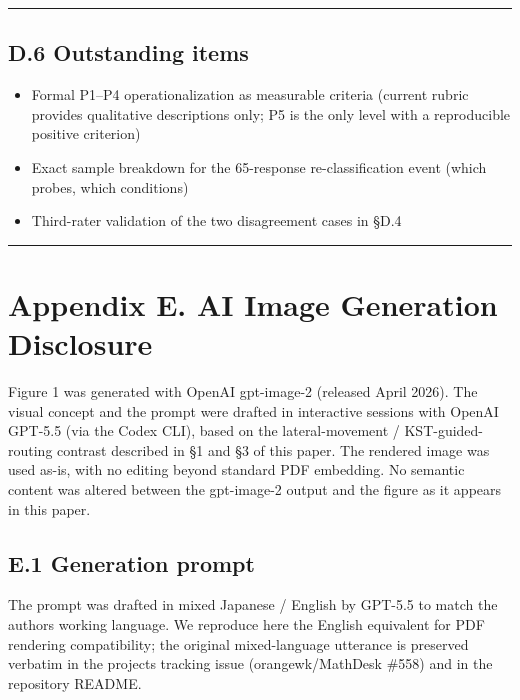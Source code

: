 \documentclass[
]{article}
\providecommand{\tightlist}{%
  \setlength{\itemsep}{0pt}\setlength{\parskip}{0pt}}
\begin{document}
\begin{center}\rule{0.5\linewidth}{0.5pt}\end{center}

\subsection{D.6 Outstanding items}\label{d6-outstanding-items}

\begin{itemize}
\tightlist
\item
  Formal P1--P4 operationalization as measurable criteria (current rubric provides qualitative descriptions only; P5 is the only level with a reproducible positive criterion)
\item
  Exact sample breakdown for the 65-response re-classification event (which probes, which conditions)
\item
  Third-rater validation of the two disagreement cases in §D.4
\end{itemize}

\begin{center}\rule{0.5\linewidth}{0.5pt}\end{center}

\section{Appendix E. AI Image Generation Disclosure}\label{appendix-e-ai-image-generation-disclosure}

Figure 1 was generated with OpenAI gpt-image-2 (released April 2026). The visual concept and the prompt were drafted in interactive sessions with OpenAI GPT-5.5 (via the Codex CLI), based on the lateral-movement / KST-guided-routing contrast described in §1 and §3 of this paper. The rendered image was used as-is, with no editing beyond standard PDF embedding. No semantic content was altered between the gpt-image-2 output and the figure as it appears in this paper.

\subsection{E.1 Generation prompt}\label{e1-generation-prompt}

The prompt was drafted in mixed Japanese / English by GPT-5.5 to match the author\textquotesingle s working language. We reproduce here the English equivalent for PDF rendering compatibility; the original mixed-language utterance is preserved verbatim in the project\textquotesingle s tracking issue (orangewk/MathDesk \#558) and in the repository README.
\end{document}
